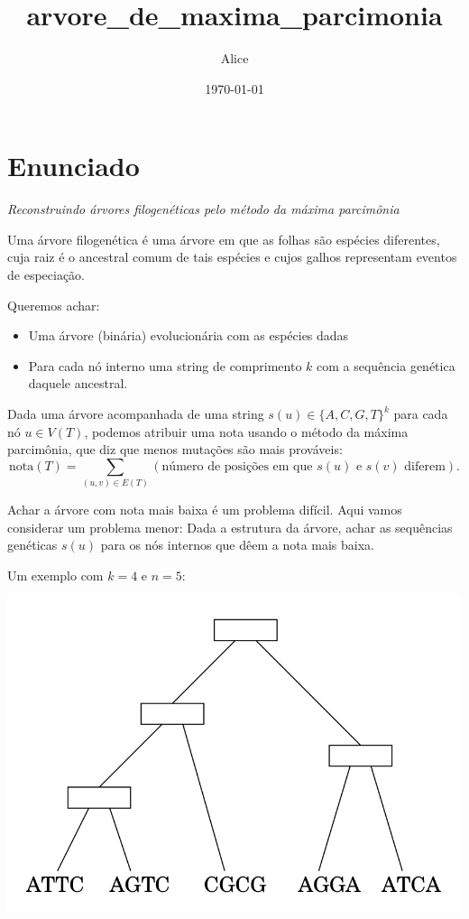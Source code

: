 \documentclass[11pt]{article}
\author{Alice}
\date{\today}
\title{arvore\_de\_maxima\_parcimonia}
\begin{document}
\maketitle
\tableofcontents

\section{Enunciado}
\label{sec-1}

\textit{Reconstruindo árvores filogenéticas pelo método da máxima parcimônia}

Uma árvore filogenética é uma árvore em que as folhas são espécies
diferentes, cuja raiz é o ancestral comum de tais espécies e cujos
galhos representam eventos de especiação.

Queremos achar:

\begin{itemize}
\item Uma árvore (binária) evolucionária com as espécies dadas
\item Para cada nó interno uma string de comprimento $k$ com a
sequência genética daquele ancestral.
\end{itemize}


Dada uma árvore acompanhada de uma string $s(u) \in \{A, C, G, T\}^k$ para
cada nó $u \in V(T)$, podemos atribuir uma nota usando o método da
máxima parcimônia, que diz que menos mutações são mais prováveis:
\[ \mathrm{nota}(T) = \sum_{(u,v) \in E(T)} (\text{número de posições em que }s(u)\text{ e }s(v)\text{ diferem}). \]

Achar a árvore com nota mais baixa é um problema difícil. Aqui vamos
considerar um problema menor: Dada a estrutura da árvore, achar as
sequências genéticas $s(u)$ para os nós internos que dêem a nota mais
baixa.

Um exemplo com $k = 4$ e $n = 5$:

\href{http:github.com/adusca/FGV-EDA/6_30/tree.png}{\includegraphics[width=.9\linewidth]{tree.png}}
\end{document}
